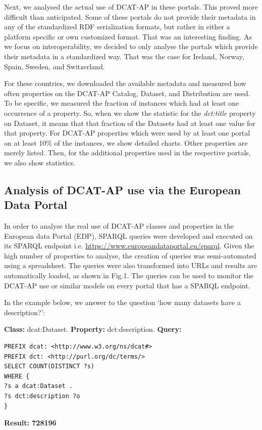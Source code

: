 \documentclass[<options>]{elsarticle}
\begin{document}
Next, we analysed the actual use of DCAT-AP in these portals. This proved more difficult than anticipated. Some of these portals do not provide their metadata in any of the standardized RDF serialization formats, but rather in either a platform specific or own customized format. That was an interesting finding. As we focus on interoperability, we decided to only analyse the portals which provide their metadata in a standardized way. That was the case for Ireland, Norway, Spain, Sweden, and Switzerland. 

For these countries, we downloaded the available metadata and measured how often properties on the DCAT-AP Catalog, Dataset, and Distribution are used. To be specific, we measured the fraction of instances which had at least one occurrence of a property. So, when we show the statistic for the \textit{dct:title} property on Dataset, it means that that fraction of the Datasets had at least one value for that property. For DCAT-AP properties which were used by at least one portal on at least 10\% of the instances, we show detailed charts. Other properties are merely listed. Then, for the additional properties used in the respective portals, we also show statistics.

\subsection{Analysis of DCAT-AP use via the European Data Portal}

In order to analyse the real use of DCAT-AP classes and properties in the European data Portal (EDP), SPARQL queries were developed and executed on its SPARQL endpoint i.e. \url{https://www.europeandataportal.eu/sparql}. Given the high number of properties to analyse, the creation of queries was semi-automated using a spreadsheet. The queries were also transformed into URLs and results are automatically loaded, as shown in Fig.1. The queries can be used to monitor the DCAT-AP use or similar models on every portal that has a SPARQL endpoint.

In the example below, we answer to the question ‘how many datasets have a description?’:

\textbf{Class:} dcat:Dataset. \textbf{Property:} dct:description.
\textbf{Query:}
\begin{lstlisting}
PREFIX dcat: <http://www.w3.org/ns/dcat#>
PREFIX dct: <http://purl.org/dc/terms/>
SELECT COUNT(DISTINCT ?s)
WHERE {
?s a dcat:Dataset .
?s dct:description ?o
}
\end{lstlisting}
\textbf{Result: 728196}
\end{document}
